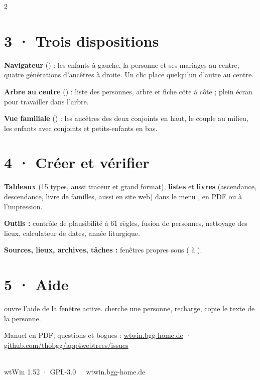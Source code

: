 \documentclass[a4paper, 9.5pt, parskip=half]{scrartcl}
\begin{document}
\begin{multicols}{2}
\section*{3 · Trois dispositions}
\textbf{Navigateur} () : les enfants à gauche, la personne et ses mariages au centre, quatre générations d’ancêtres à droite. Un clic place quelqu’un d’autre au centre.

\textbf{Arbre au centre} () : liste des personnes, arbre et fiche côte à côte ; plein écran pour travailler dans l’arbre.

\textbf{Vue familiale} () : les ancêtres des deux conjoints en haut, le couple au milieu, les enfants avec conjoints et petits-enfants en bas.
\section*{4 · Créer et vérifier}
\textbf{Tableaux} (15 types, aussi traceur et grand format), \textbf{listes} et \textbf{livres} (ascendance, descendance, livre de familles, aussi en site web) dans le menu , en PDF ou à l’impression.

\textbf{Outils :} contrôle de plausibilité à 61 règles, fusion de personnes, nettoyage des lieux, calculateur de dates, année liturgique.

\textbf{Sources, lieux, archives, tâches :} fenêtres propres sous  ( à ).
\section*{5 · Aide}
 ouvre l’aide de la fenêtre active.  cherche une personne,  recharge,  copie le texte de la personne.

Manuel en PDF, questions et bogues : \href{https://wtwin.bgg-home.de}{wtwin.bgg-home.de} · \href{https://github.com/thobgg/app4webtrees/issues}{github.com/thobgg/app4webtrees/issues}
\vspace{3mm}
\noindent{}
\end{multicols}
\vspace{2mm}
\noindent{\color{wtLinie}\rule{\linewidth}{0.5pt}}\\[2pt]
{\sffamily\footnotesize\color{wtGrau}wtWin 1.52 · GPL-3.0 · wtwin.bgg-home.de}
\end{document}
